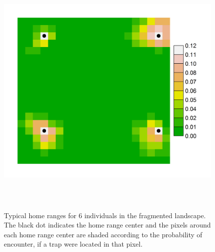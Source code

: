 \documentclass[12pt]{article}
\begin{document}
\begin{figure}
\begin{center}
\includegraphics[height=5in,width=6in]{figs/home_rangesv2}
\end{center}
\caption{
Typical home ranges for 6 individuals in the fragmented landscape. %
The black dot indicates the home
  range center and the pixels around each home range center are shaded
according to the probability of encounter, if a trap were located in
that pixel.
}
\label{fig.homeranges}
\end{figure}

\clearpage
\newpage
\end{document}

